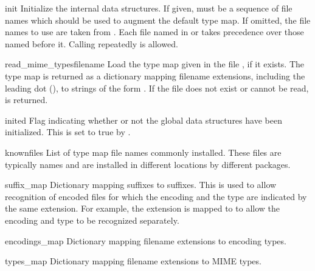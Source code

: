 \begin{funcdesc}{init}{}
Initialize the internal data structures.  If given,  must
be a sequence of file names which should be used to augment the
default type map.  If omitted, the file names to use are taken from
.  Each file named in  or
 takes precedence over those named before it.
Calling  repeatedly is allowed.
\end{funcdesc}

\begin{funcdesc}{read_mime_types}{filename}
Load the type map given in the file , if it exists.  The 
type map is returned as a dictionary mapping filename extensions,
including the leading dot (), to strings of the form
.  If the file  does
not exist or cannot be read,  is returned.
\end{funcdesc}


\begin{datadesc}{inited}
Flag indicating whether or not the global data structures have been
initialized.  This is set to true by .
\end{datadesc}

\begin{datadesc}{knownfiles}
List of type map file names commonly installed.  These files are
typically names  and are installed in different
locations by different packages.%
\end{datadesc}

\begin{datadesc}{suffix_map}
Dictionary mapping suffixes to suffixes.  This is used to allow
recognition of encoded files for which the encoding and the type are
indicated by the same extension.  For example, the 
extension is mapped to  to allow the encoding and type
to be recognized separately.
\end{datadesc}

\begin{datadesc}{encodings_map}
Dictionary mapping filename extensions to encoding types.
\end{datadesc}

\begin{datadesc}{types_map}
Dictionary mapping filename extensions to MIME types.
\end{datadesc}
